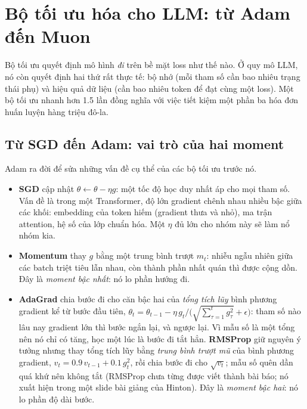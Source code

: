 
\section{Bộ tối ưu hóa cho LLM: từ Adam đến Muon}
\label{sec:llm_optimizers}

Bộ tối ưu quyết định mô hình \emph{đi} trên bề mặt loss như thế nào. Ở quy mô LLM, nó còn quyết định hai thứ rất thực tế: bộ nhớ (mỗi tham số cần bao nhiêu trạng thái phụ) và hiệu quả dữ liệu (cần bao nhiêu token để đạt cùng một loss). Một bộ tối ưu nhanh hơn 1.5 lần đồng nghĩa với việc tiết kiệm một phần ba hóa đơn huấn luyện hàng triệu đô-la.

\subsection{Từ SGD đến Adam: vai trò của hai moment}
\label{ssec:sgd_to_adam}
Adam ra đời để sửa những vấn đề cụ thể của các bộ tối ưu trước nó.
\begin{itemize}
	\item \textbf{SGD} cập nhật $\theta \leftarrow \theta - \eta g$: một tốc độ học duy nhất áp cho mọi tham số. Vấn đề là trong một Transformer, độ lớn gradient chênh nhau nhiều bậc giữa các khối: embedding của token hiếm (gradient thưa và nhỏ), ma trận attention, hệ số của lớp chuẩn hóa. Một $\eta$ đủ lớn cho nhóm này sẽ làm nổ nhóm kia.
	\item \textbf{Momentum} thay $g$ bằng một trung bình trượt $m_t$: nhiễu ngẫu nhiên giữa các batch triệt tiêu lẫn nhau, còn thành phần nhất quán thì được cộng dồn. Đây là \emph{moment bậc nhất}: nó lo phần hướng đi.
	\item \textbf{AdaGrad} chia bước đi cho căn bậc hai của \emph{tổng tích lũy} bình phương gradient kể từ bước đầu tiên, $\theta_t = \theta_{t-1} - \eta\, g_t \big/ \big(\sqrt{\textstyle\sum_{\tau=1}^{t} g_\tau^2} + \epsilon\big)$: tham số nào lâu nay gradient lớn thì bước ngắn lại, và ngược lại. Vì mẫu số là một tổng nên nó chỉ có tăng, học một lúc là bước đi tắt hẳn. \textbf{RMSProp} giữ nguyên ý tưởng nhưng thay tổng tích lũy bằng \emph{trung bình trượt mũ} của bình phương gradient, $v_t = 0.9\, v_{t-1} + 0.1\, g_t^2$, rồi chia bước đi cho $\sqrt{v_t}$; mẫu số quên dần quá khứ nên không tắt (RMSProp chưa từng được viết thành bài báo; nó xuất hiện trong một slide bài giảng của Hinton). Đây là \emph{moment bậc hai}: nó lo phần độ dài bước.
\end{itemize}

